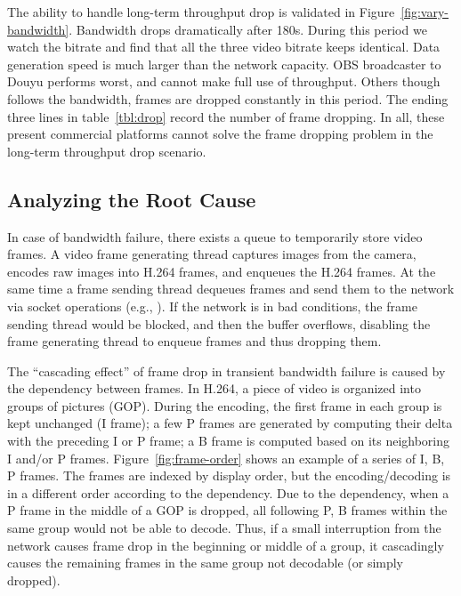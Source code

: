 The ability to handle long-term throughput drop is validated in Figure~\ref{fig:vary-bandwidth}. Bandwidth drops dramatically after 180s. During this period we watch the bitrate and find that all the three video bitrate keeps identical. Data generation speed is much larger than the network capacity. OBS broadcaster to Douyu performs worst, and cannot make full use of throughput. Others though follows the bandwidth, frames are dropped constantly in this period. The ending three lines in table~\ref{tbl:drop} record the number of frame dropping. In all, these present commercial platforms cannot solve the frame dropping problem in the long-term throughput drop scenario.

\subsection{Analyzing the Root Cause}
%
In case of bandwidth failure, there exists a queue to temporarily store video frames. A video frame generating thread captures images from the camera, encodes raw images into H.264 frames, and enqueues the H.264 frames. At the same time a frame sending thread dequeues frames and send them to the network via socket operations (e.g., \mywrite).
If the network is in bad conditions, the frame sending thread would be blocked, and then the buffer overflows, disabling the frame generating thread to enqueue frames and thus dropping them.


%
The ``cascading effect'' of frame drop in transient bandwidth failure is caused by the dependency between frames. In H.264, a piece of video is organized into groups of pictures (GOP). During the encoding, the first frame in each group is kept unchanged (I frame); a few P frames are generated by computing their delta with the preceding I or P frame; a B frame is computed based on its neighboring I and/or P frames. Figure~\ref{fig:frame-order} shows an example of a series of I, B, P frames. The frames are indexed by display order, but the encoding/decoding is in a different order according to the dependency. Due to the dependency, when a P frame in the middle of a GOP is dropped, all following P, B frames within the same group would not be able to decode. Thus, if a small interruption from the network causes frame drop in the beginning or middle of a group, it cascadingly causes the remaining frames in the same group not decodable (or simply dropped).

